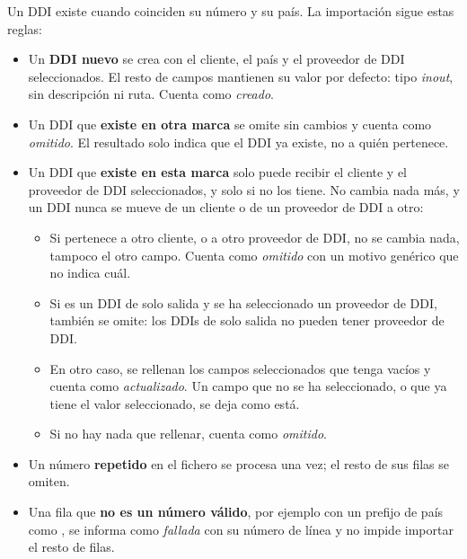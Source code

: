 \documentclass[letterpaper,10pt,spanish]{sphinxmanual}
\begin{document}
Un DDI existe cuando coinciden su número y su país. La importación sigue estas reglas:
\begin{itemize}
\item {} 
Un \textbf{DDI nuevo} se crea con el cliente, el país y el proveedor de DDI seleccionados. El resto de campos mantienen su valor por defecto: tipo \emph{inout}, sin descripción ni ruta. Cuenta como \emph{creado}.

\item {} 
Un DDI que \textbf{existe en otra marca} se omite sin cambios y cuenta como \emph{omitido}. El resultado solo indica que el DDI ya existe, no a quién pertenece.

\item {} 
Un DDI que \textbf{existe en esta marca} solo puede recibir el cliente y el proveedor de DDI seleccionados, y solo si no los tiene. No cambia nada más, y un DDI nunca se mueve de un cliente o de un proveedor de DDI a otro:
\begin{itemize}
\item {} 
Si pertenece a otro cliente, o a otro proveedor de DDI, no se cambia nada, tampoco el otro campo. Cuenta como \emph{omitido} con un motivo genérico que no indica cuál.

\item {} 
Si es un DDI de solo salida y se ha seleccionado un proveedor de DDI, también se omite: los DDIs de solo salida no pueden tener proveedor de DDI.

\item {} 
En otro caso, se rellenan los campos seleccionados que tenga vacíos y cuenta como \emph{actualizado}. Un campo que no se ha seleccionado, o que ya tiene el valor seleccionado, se deja como está.

\item {} 
Si no hay nada que rellenar, cuenta como \emph{omitido}.

\end{itemize}

\item {} 
Un número \textbf{repetido} en el fichero se procesa una vez; el resto de sus filas se omiten.

\item {} 
Una fila que \textbf{no es un número válido}, por ejemplo con un prefijo de país como , se informa como \emph{fallada} con su número de línea y no impide importar el resto de filas.

\end{itemize}
\end{document}
